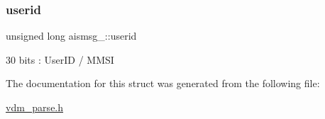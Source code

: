 \subsubsection{\texorpdfstring{userid}{userid}}
{\footnotesize\ttfamily unsigned long aismsg\+\_\+::userid}



30 bits \+: User\+ID / M\+M\+SI 



The documentation for this struct was generated from the following file\+:\begin{DoxyCompactItemize}
\item 
\mbox{\hyperlink{vdm__parse_8h}{vdm\+\_\+parse.\+h}}\end{DoxyCompactItemize}

